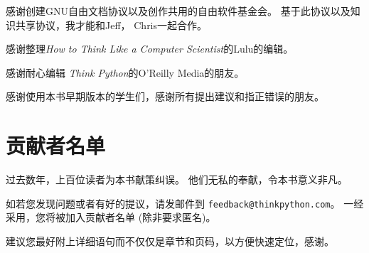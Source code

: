\documentclass[10pt]{book}
\begin{document}
感谢创建GNU自由文档协议以及创作共用的自由软件基金会。
基于此协议以及知识共享协议，我才能和Jeff， Chris一起合作。


感谢整理{\em How to Think Like a Computer Scientist}的Lulu的编辑。

感谢耐心编辑 {\em Think Python}的O'Reilly Media的朋友。

感谢使用本书早期版本的学生们，感谢所有提出建议和指正错误的朋友。


\section*{贡献者名单}

过去数年，上百位读者为本书献策纠误。
他们无私的奉献，令本书意义非凡。

如若您发现问题或者有好的提议，请发邮件到 
{\tt feedback@thinkpython.com}。 一经采用，您将被加入贡献者名单
(除非要求匿名)。 

建议您最好附上详细语句而不仅仅是章节和页码，以方便快速定位，感谢。
\end{document}
